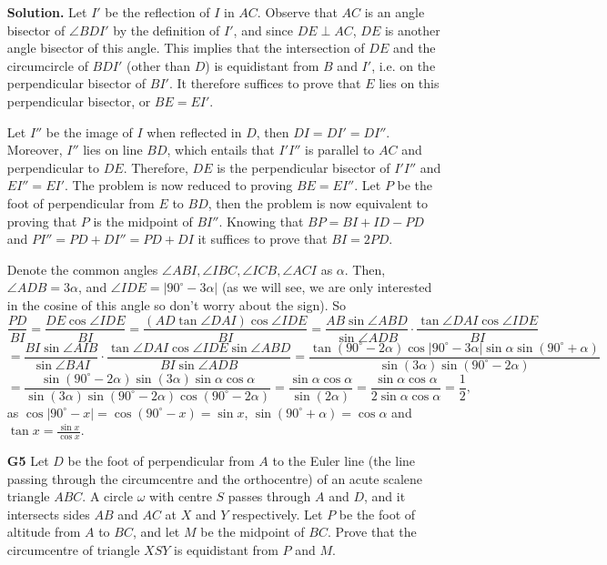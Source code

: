 \documentclass[11pt,a4paper]{article}
\begin{document}
\begin{itemize}
\textbf{Solution.} 
Let $I'$ be the reflection of $I$ in $AC$. 
Observe that $AC$ is an angle bisector of $\angle BDI'$ by the definition of $I'$, 
and since $DE\perp AC$, 
$DE$ is another angle bisector of this angle. 
This implies that the intersection of $DE$ and the circumcircle of $BDI'$ (other than $D$) is equidistant from $B$ and $I'$, 
i.e. on the perpendicular bisector of $BI'$. 
It therefore suffices to prove that $E$ lies on this perpendicular bisector, or $BE=EI'$. 

Let $I''$ be the image of $I$ when reflected in $D$, then $DI=DI'=DI''$. 
Moreover, $I''$ lies on line $BD$, which entails that $I'I''$ is parallel to $AC$ and perpendicular to $DE$. 
Therefore, $DE$ is the perpendicular bisector of $I'I''$ and $EI''=EI'$. 
The problem is now reduced to proving $BE=EI''$. 
Let $P$ be the foot of perpendicular from $E$ to $BD$, 
then the problem is now equivalent to proving that $P$ is the midpoint of $BI''$. 
Knowing that $BP=BI+ID-PD$ and $PI''=PD+DI''=PD+DI$ it suffices to prove that $BI=2PD$. 

Denote the common angles $\angle ABI, \angle IBC, \angle ICB, \angle ACI$ as $\alpha$. 
Then, $\angle ADB=3\alpha$, and $\angle IDE=|90^{\circ}-3\alpha|$ (as we will see, we are only interested in the cosine of this angle so don't worry about the sign). 
So \[\frac{PD}{BI}
=\frac{DE\cos\angle IDE}{BI}
=\frac{(AD\tan\angle DAI)\cos\angle IDE}{BI}
=\frac{AB\sin\angle ABD}{\sin\angle ADB}\cdot\frac{\tan\angle DAI\cos\angle IDE}{BI}\]
\[=\frac{BI\sin\angle AIB}{\sin\angle BAI}\cdot\frac{\tan\angle DAI\cos\angle IDE\sin\angle ABD}{BI\sin\angle ADB}
=\frac{\tan(90^{\circ}-2\alpha)\cos|90^{\circ}-3\alpha|\sin\alpha\sin(90^{\circ}+\alpha)}{\sin(3\alpha)\sin(90^{\circ}-2\alpha)}\]
\[=\frac{\sin(90^{\circ}-2\alpha)\sin(3\alpha)\sin\alpha\cos\alpha}{\sin(3\alpha)\sin(90^{\circ}-2\alpha)\cos(90^{\circ}-2\alpha)}
=\frac{\sin\alpha\cos\alpha}{\sin (2\alpha)}
=\frac{\sin\alpha\cos\alpha}{2\sin\alpha\cos\alpha}
=\frac 12,\] 
as $\cos|90^{\circ}-x|=\cos(90^{\circ}-x)=\sin x$, $\sin(90^{\circ}+\alpha)=\cos\alpha$ and $\tan x=\frac{\sin x}{\cos x}$. 

\newpage

\item[\textbf{G5}]
Let $D$ be the foot of perpendicular from $A$ to the Euler line (the line passing through the circumcentre and the orthocentre) of an acute scalene triangle $ABC$. A circle $\omega$ with centre $S$ passes through $A$ and $D$, and it intersects sides $AB$ and $AC$ at $X$ and $Y$ respectively. Let $P$ be the foot of altitude from $A$ to $BC$, and let $M$ be the midpoint of $BC$. Prove that the circumcentre of triangle $XSY$ is equidistant from $P$ and $M$.


\end{itemize}
\end{document}
